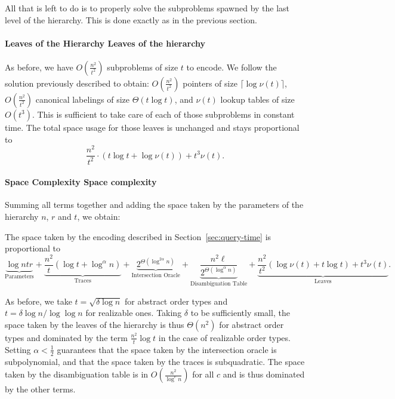 All that is left to do is to properly solve the subproblems spawned by the last
level of the hierarchy. This is done exactly as in the previous section.
%
\paragraph*{\iftitlecase%
Leaves of the Hierarchy\else%
Leaves of the hierarchy\fi}
%
As before, we have \(O(\frac{n^2}{t^2})\) subproblems of size \(t\) to encode.
We follow the solution previously described to obtain:
\(O(\frac{n^2}{t^2})\) pointers of size \(\lceil \log{\nu(t)} \rceil\),
\(O(\frac{n^2}{t^2})\) canonical labelings of size \(\Theta(t \log t)\),
and \(\nu(t)\) lookup tables of size \(O(t^3)\).
%
This is sufficient to take care of each of those subproblems in constant time.
The total space usage for those leaves is unchanged and stays proportional to
\begin{displaymath}
  \frac{n^2}{t^2} \cdot (t \log t + \log{\nu(t)}) + t^3 \nu(t).
\end{displaymath}

\paragraph*{\iftitlecase%
Space Complexity\else%
Space complexity\fi}
Summing all terms together and adding the space taken by the
parameters of the hierarchy \(n\), \(r\) and \(t\), we obtain:
\begin{lemma}\label{lem:space-2-all-query}
  The space taken by the encoding described in Section~\ref{sec:query-time} is
  proportional to
    \begin{displaymath}
    \underbrace{\log ntr}_{\text{Parameters}}
    +
    \underbrace{\frac{n^2}{t} (\log t + \log^{\alpha} n)}_{\text{Traces}}
    +
    \underbrace{2^{\Theta(\log^{2\alpha} n)}}_{\text{Intersection Oracle}}
    +
    \underbrace{\frac{n^2 \ell}{2^{\Theta(\log^{\alpha} n)}}}_{\text{Disambiguation Table}}
    +
    \underbrace{\frac{n^2}{t^2} ( \log \nu(t) + t \log t) + t^3 \nu(t)}_{\text{Leaves}}.
    \end{displaymath}
\end{lemma}
As before,
we take \(t = \sqrt{\delta \log n}\) for abstract order types and \(t = \delta
\log n / \log\log n\) for realizable ones.
Taking \(\delta\) to be sufficiently small,
the space taken by the leaves of the hierarchy is thus \(\Theta(n^2)\) for
abstract order types and dominated by the term \(\frac{n^2}{t} \log t\)
in the case of realizable order types.
%
Setting \(\alpha < \frac 12\)
guarantees
that the space taken by the intersection oracle is subpolynomial,
and
that the space taken by the traces is subquadratic.
%
The space taken by the
disambiguation table is in \(O(\frac{n^2}{\log^c n})\) for all \(c\) and is
thus dominated by the other terms.

